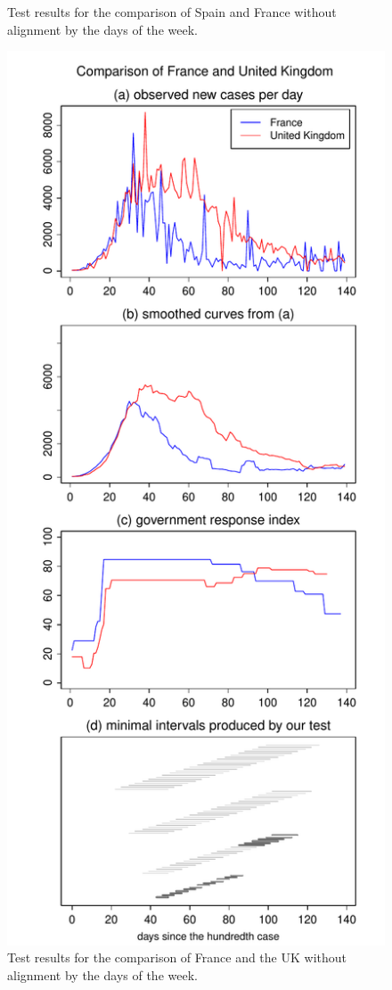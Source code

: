 \documentclass[a4paper,12pt]{article}
\numberwithin{equation}{section}
\begin{document}
\begin{figure}[p!]
\begin{minipage}[t]{0.49\textwidth}
\caption{Test results for the comparison of Spain and France without alignment by the days of the week.}
\end{minipage}
\hspace{0.25cm}
\begin{minipage}[t]{0.49\textwidth}
\includegraphics[width=\textwidth]{plots/FRA_vs_GBR}
\caption{Test results for the comparison of France and the UK without alignment by the days of the week.}
\end{minipage}
\end{figure}
\end{document}
